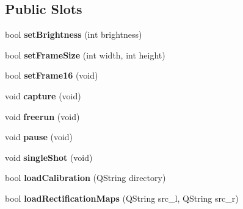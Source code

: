 \subsection*{Public Slots}
\begin{DoxyCompactItemize}
\item 
\hypertarget{class_q_stereo_camera_ad4c4726e163c343e86db8d0e7ba4f93c}{}bool {\bfseries set\+Brightness} (int brightness)\label{class_q_stereo_camera_ad4c4726e163c343e86db8d0e7ba4f93c}

\item 
\hypertarget{class_q_stereo_camera_a5d2b6eee1d2f0e881268af5e537f38f7}{}bool {\bfseries set\+Frame\+Size} (int width, int height)\label{class_q_stereo_camera_a5d2b6eee1d2f0e881268af5e537f38f7}

\item 
\hypertarget{class_q_stereo_camera_afa1ecf20b3ac6208da7575cf9fec81b1}{}bool {\bfseries set\+Frame16} (void)\label{class_q_stereo_camera_afa1ecf20b3ac6208da7575cf9fec81b1}

\item 
\hypertarget{class_q_stereo_camera_a8c5d6580c83c7e20a951d0ac879306e1}{}void {\bfseries capture} (void)\label{class_q_stereo_camera_a8c5d6580c83c7e20a951d0ac879306e1}

\item 
\hypertarget{class_q_stereo_camera_adbeac51ba83c6286d5d5985837c15b69}{}void {\bfseries freerun} (void)\label{class_q_stereo_camera_adbeac51ba83c6286d5d5985837c15b69}

\item 
\hypertarget{class_q_stereo_camera_a5dda44ada727369825e774b9d469b408}{}void {\bfseries pause} (void)\label{class_q_stereo_camera_a5dda44ada727369825e774b9d469b408}

\item 
\hypertarget{class_q_stereo_camera_a29dc0fc560511414b6e534d68d54ce81}{}void {\bfseries single\+Shot} (void)\label{class_q_stereo_camera_a29dc0fc560511414b6e534d68d54ce81}

\item 
\hypertarget{class_q_stereo_camera_affc508dcce0294ff148cf1d0ee7d611e}{}bool {\bfseries load\+Calibration} (Q\+String directory)\label{class_q_stereo_camera_affc508dcce0294ff148cf1d0ee7d611e}

\item 
\hypertarget{class_q_stereo_camera_ae8118d48724d1541ded51b924dfa44e2}{}bool {\bfseries load\+Rectification\+Maps} (Q\+String src\+\_\+l, Q\+String src\+\_\+r)\label{class_q_stereo_camera_ae8118d48724d1541ded51b924dfa44e2}


\end{DoxyCompactItemize}
